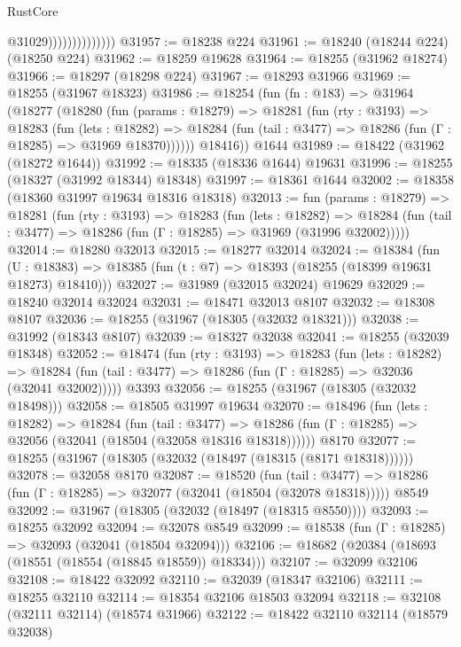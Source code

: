 \begin{lexlean}{RustCore}
\begin{coremodule}
                                @31029))))))))))))))
@31957 := @18238 @224
@31961 := @18240 (@18244 @224) (@18250 @224)
@31962 := @18259 @19628
@31964 := @18255 (@31962 @18274)
@31966 := @18297 (@18298 @224)
@31967 := @18293 @31966
@31969 := @18255 (@31967 @18323)
@31986 := @18254
    (fun (fn : @183) =>
    @31964
      (@18277
        (@18280
          (fun (params : @18279) =>
          @18281
            (fun (rty : @3193) =>
            @18283
              (fun (lets : @18282) =>
              @18284 (fun (tail : @3477) => @18286 (fun (Γ : @18285) => @31969 @18370))))))
        @18416))
    @1644
@31989 := @18422 (@31962 (@18272 @1644))
@31992 := @18335 (@18336 @1644) @19631
@31996 := @18255 (@18327 (@31992 @18344) @18348)
@31997 := @18361 @1644
@32002 := @18358 (@18360 @31997 @19634 @18316 @18318)
@32013 := fun (params : @18279) =>
  @18281
    (fun (rty : @3193) =>
    @18283
      (fun (lets : @18282) =>
      @18284 (fun (tail : @3477) => @18286 (fun (Γ : @18285) => @31969 (@31996 @32002)))))
@32014 := @18280 @32013
@32015 := @18277 @32014
@32024 := @18384
    (fun (U : @18383) => @18385 (fun (t : @7) => @18393 (@18255 (@18399 @19631 @18273) @18410)))
@32027 := @31989 (@32015 @32024) @19629
@32029 := @18240 @32014 @32024
@32031 := @18471 @32013 @8107
@32032 := @18308 @8107
@32036 := @18255 (@31967 (@18305 (@32032 @18321)))
@32038 := @31992 (@18343 @8107)
@32039 := @18327 @32038
@32041 := @18255 (@32039 @18348)
@32052 := @18474
    (fun (rty : @3193) =>
    @18283
      (fun (lets : @18282) =>
      @18284 (fun (tail : @3477) => @18286 (fun (Γ : @18285) => @32036 (@32041 @32002)))))
    @3393
@32056 := @18255 (@31967 (@18305 (@32032 @18498)))
@32058 := @18505 @31997 @19634
@32070 := @18496
    (fun (lets : @18282) =>
    @18284
      (fun (tail : @3477) =>
      @18286 (fun (Γ : @18285) => @32056 (@32041 (@18504 (@32058 @18316 @18318))))))
    @8170
@32077 := @18255 (@31967 (@18305 (@32032 (@18497 (@18315 (@8171 @18318))))))
@32078 := @32058 @8170
@32087 := @18520
    (fun (tail : @3477) => @18286 (fun (Γ : @18285) => @32077 (@32041 (@18504 (@32078 @18318)))))
    @8549
@32092 := @31967 (@18305 (@32032 (@18497 (@18315 @8550))))
@32093 := @18255 @32092
@32094 := @32078 @8549
@32099 := @18538 (fun (Γ : @18285) => @32093 (@32041 (@18504 @32094)))
@32106 := @18682 (@20384 (@18693 (@18551 (@18554 (@18845 @18559)) @18334)))
@32107 := @32099 @32106
@32108 := @18422 @32092
@32110 := @32039 (@18347 @32106)
@32111 := @18255 @32110
@32114 := @18354 @32106 @18503 @32094
@32118 := @32108 (@32111 @32114) (@18574 @31966)
@32122 := @18422 @32110 @32114 (@18579 @32038)

\end{coremodule}
\end{lexlean}
